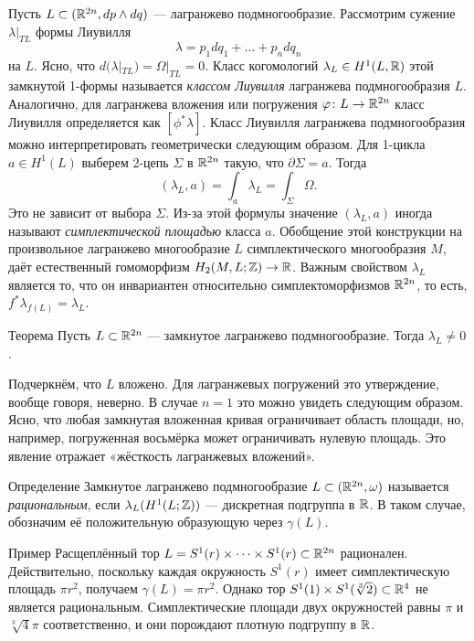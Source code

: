 Пусть $L \subset (\mathbb{R}^{2n}, dp \wedge dq)$ --- лагранжево подмногообразие.
Рассмотрим сужение $\lambda|_{TL}$ формы Лиувилля 
\[\lambda = p_1 dq_1+\dots+ p_n dq_n\]
на $L$.
Ясно, что $d (\lambda|_{TL}) = \Omega|_{TL} = 0$.
Класс когомологий $\lambda_L \in H^1 (L, \mathbb{R})$ этой замкнутой 1-формы называется \emph{классом Лиувилля} лагранжева подмногообразия $L$.
Аналогично, для лагранжева вложения или погружения $\varphi\colon L \to \mathbb{R}^{2n}$ класс Лиувилля определяется как $[\phi^\ast \lambda]$.
Класс Лиувилля лагранжева подмногообразия можно интерпретировать геометрически следующим образом.
Для 1-цикла $a\in H^1 (L)$ выберем 2-цепь $\Sigma$ в $\mathbb{R}^{2n}$ такую, что $\partial\Sigma = a$.
Тогда
\[(\lambda_L, a) = \int_a\lambda_L = \int_\Sigma\Omega.\]
Это  не зависит от выбора $\Sigma$.
Из-за этой формулы значение $(\lambda_L, a)$ иногда называют \emph{симплектической площадью} класса $a$.
Обобщение этой конструкции на произвольное лагранжево многообразие $L$
 симплектического многообразия $M$, даёт естественный гомоморфизм $H_2 (M, L; \mathbb{Z}) \to \mathbb{R}$.
Важным свойством  $\lambda_L$ является то, что он инвариантен относительно симплектоморфизмов $\mathbb{R}^{2n}$,
то есть,
$f^\ast \lambda_{f (L)} = \lambda_L$.

\begin{thm}[(\cite{G1})]{Теорема}\label{3.2.A}
Пусть $L \subset \mathbb{R}^{2n}$ --- замкнутое лагранжево подмногообразие.
Тогда $\lambda_L \ne 0$.
\end{thm}

Подчеркнём, что $L$ вложено.
Для лагранжевых погружений это утверждение, вообще говоря, неверно.
В случае $n = 1$ это можно увидеть следующим образом.
Ясно, что любая замкнутая вложенная кривая ограничивает область
 площади, но, например, погруженная восьмёрка может ограничивать нулевую площадь.
Это явление отражает «жёсткость лагранжевых вложений».

\begin{ex*}{Определение}
Замкнутое лагранжево подмногообразие $L \subset (\mathbb{R}^{2n}, \omega)$
называется \emph{рациональным}, если $\lambda_L (H^1 (L; \mathbb{Z}))$ ---
дискретная подгруппа в $\mathbb{R}$.
В таком случае, обозначим её положительную образующую через $\gamma (L)$.
\end{ex*}

\begin{ex*}{Пример}
Расщеплённый тор $L = S^1 (r) \times\dots\times S^1 (r) \subset
\mathbb{R}^{2n}$ рационален. 
Действительно, поскольку каждая окружность $S^1 (r)$ имеет
симплектическую площадь $\pi r^2$, получаем $\gamma (L) = \pi r^2$. 
Однако тор $S^1(1)\times S^1(\sqrt[3]{2}) \subset \mathbb{R}^4$ не является
рациональным.
Симплектические площади двух окружностей равны $\pi$  и
$\sqrt[3]{4}\pi$ соответственно, и они порождают плотную подгруппу в
$\mathbb{R}$.
\end{ex*}

